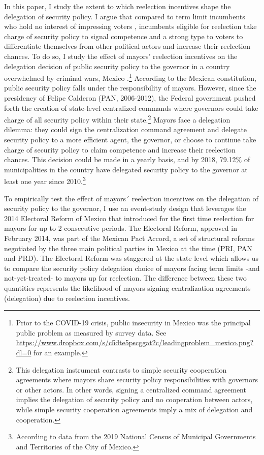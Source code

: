 \documentclass[12pt]{amsart}
\numberwithin{equation}{section}
\theoremstyle{definition}
\theoremstyle{definition}
\theoremstyle{definition}
\begin{document}
In this paper, I study the extent to which reelection incentives shape the delegation of security policy. I argue that compared to term limit incumbents who hold no interest of impressing voters \citep{ashworth_2012}, incumbents eligible for reelection take charge of security policy to signal competence and a strong type to voters to differentiate themselves from other political actors and increase their reelection chances.  To do so, I study the effect of mayors' reelection incentives on the delegation decision of public security policy to the governor in a country overwhelmed by criminal wars, Mexico \citep{ley_trejo_2020}.\footnote{Prior to the COVID-19 crisis, public insecurity in Mexico was the principal public problem as measured by survey data. See \url{https://www.dropbox.com/s/c5dte5pscggat2c/leadingproblem_mexico.png?dl=0} for an example.} According to the Mexican constitution, public security policy falls under the responsibility of mayors. However, since the presidency of Felipe Calderon (PAN, 2006-2012), the Federal government pushed forth the creation of state-level centralized commands where governors could take charge of all security policy within their state.\footnote{This delegation instrument contrasts to simple security cooperation agreements where mayors share security policy responsibilities with governors or other actors. In other words, signing a centralized command agreement implies the delegation of security policy and no cooperation between actors, while simple security cooperation agreements imply a mix of delegation and cooperation.} Mayors face a delegation dilemma: they could sign the centralization command agreement and delegate security policy to a more efficient agent, the governor, or choose to continue take charge of security policy to claim competence and increase their reelection chances. This decision could be made in a yearly basis, and by 2018, 79.12\% of municipalities in the country have delegated security policy to the governor at least one year since 2010.\footnote{According to data from the 2019 National Census of Municipal Governments and Territories of the City of Mexico.} 
          
To empirically test the effect of mayors´ reelection incentives on the delegation of security policy to the governor, I use an event-study design that leverages the 2014 Electoral Reform of Mexico that introduced for the first time reelection for mayors for up to 2 consecutive periods. The Electoral Reform, approved in February 2014, was part of the Mexican Pact Accord, a set of structural reforms negotiated by the three main political parties in Mexico at the time (PRI, PAN and PRD). The Electoral Reform was staggered at the state level which allows us to compare the security policy delegation choice of mayors facing term limits -and not-yet-treated- to mayors up for reelection. The difference between these two quantities represents the likelihood of mayors signing centralization agreements (delegation) due to reelection incentives. 
          
\end{document}

